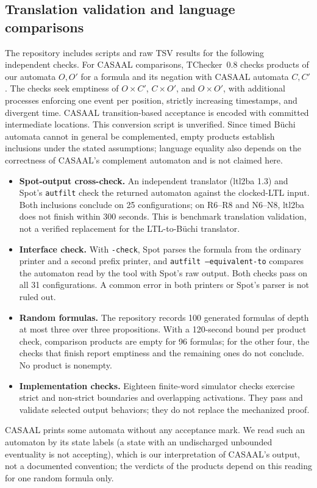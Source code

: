\subsection{Translation validation and language comparisons}
\label{sec:validation}
The repository includes scripts and raw TSV results for the following
independent checks. For CASAAL comparisons, TChecker~0.8 checks products of
our automata $O,O'$ for a formula and its negation with CASAAL automata
$C,C'$. The checks seek emptiness of $O\times C'$, $C\times O'$, and
$O\times O'$, with additional processes enforcing one event per position,
strictly increasing timestamps, and divergent time. CASAAL transition-based
acceptance is encoded with committed intermediate locations. This conversion
script is unverified. Since timed B\"uchi automata cannot in general be
complemented, empty products establish inclusions under the stated
assumptions; language equality also depends on the correctness of CASAAL's
complement automaton and is not claimed here.
\begin{itemize}[leftmargin=*]
\item \textbf{Spot-output cross-check.} An independent translator (ltl2ba 1.3) and Spot's \texttt{autfilt} check the returned automaton against the clocked-LTL input. Both inclusions conclude on 25 configurations; on R6--R8 and N6--N8, ltl2ba does not finish within 300 seconds. This is benchmark translation validation, not a verified replacement for the LTL-to-B\"uchi translator.
\item \textbf{Interface check.} With \texttt{-check}, Spot parses the formula from the ordinary printer and a second prefix printer, and \texttt{autfilt --equivalent-to} compares the automaton read by the tool with Spot's raw output. Both checks pass on all 31 configurations. A common error in both printers or Spot's parser is not ruled out.
\item \textbf{Random formulas.} The repository records 100 generated formulas of depth at most three over three propositions. With a 120-second bound per product check, comparison products are empty for 96 formulas; for the other four, the checks that finish report emptiness and the remaining ones do not conclude. No product is nonempty.
\item \textbf{Implementation checks.} Eighteen finite-word simulator checks exercise strict and non-strict boundaries and overlapping activations. They pass and validate selected output behaviors; they do not replace the mechanized proof.
\end{itemize}
CASAAL prints some automata without any acceptance mark. We read such an
automaton by its state labels (a state with an undischarged unbounded
eventuality is not accepting), which is our interpretation of CASAAL's output,
not a documented convention; the verdicts of the products depend on this reading
for one random formula only.
